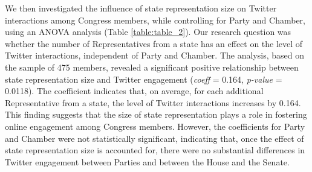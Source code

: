 \documentclass[11pt]{article}
\begin{document}
We then investigated the influence of state representation size on Twitter interactions among Congress members, while controlling for Party and Chamber, using an ANOVA analysis (Table \ref{table:table_2}). Our research question was whether the number of Representatives from a state has an effect on the level of Twitter interactions, independent of Party and Chamber. The analysis, based on the sample of 475 members, revealed a significant positive relationship between state representation size and Twitter engagement (\textit{coeff} = 0.164, \textit{p-value} = 0.0118). The coefficient indicates that, on average, for each additional Representative from a state, the level of Twitter interactions increases by 0.164. This finding suggests that the size of state representation plays a role in fostering online engagement among Congress members. However, the coefficients for Party and Chamber were not statistically significant, indicating that, once the effect of state representation size is accounted for, there were no substantial differences in Twitter engagement between Parties and between the House and the Senate.
\end{document}
